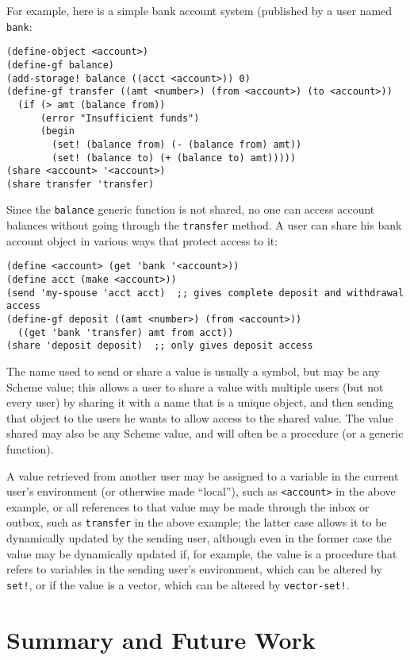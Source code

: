 \documentclass{article}
\begin{document}
For example, here is a simple bank account system (published by a user 
named \texttt{bank}:

\begin{verbatim}
(define-object <account>)
(define-gf balance)
(add-storage! balance ((acct <account>)) 0)
(define-gf transfer ((amt <number>) (from <account>) (to <account>))
  (if (> amt (balance from))
      (error "Insufficient funds")
      (begin
        (set! (balance from) (- (balance from) amt))
        (set! (balance to) (+ (balance to) amt)))))
(share <account> '<account>)
(share transfer 'transfer)
\end{verbatim}

Since the \texttt{balance} generic function is not shared, no one can
access account balances without going through the \texttt{transfer}
method.  A user can share his bank account object in various ways that 
protect access to it:

\begin{verbatim}
(define <account> (get 'bank '<account>))
(define acct (make <account>))
(send 'my-spouse 'acct acct)  ;; gives complete deposit and withdrawal access
(define-gf deposit ((amt <number>) (from <account>))
  ((get 'bank 'transfer) amt from acct))
(share 'deposit deposit)  ;; only gives deposit access
\end{verbatim}

The name used to send or share a value is usually a symbol, but may be 
any Scheme value; this allows a user to share a value with multiple users
(but not every user) by sharing it with a name that is a unique
object, and then sending that object to the users he wants to allow
access to the shared value.  The value shared may also be any Scheme
value, and will often be a procedure (or a generic function).

A value retrieved from another user may be assigned to a variable in
the current user's environment (or otherwise made ``local''), such as
\texttt{<account>} in the above example, or all references to that
value may be made through the inbox or outbox, such as
\texttt{transfer} in the above example; the latter case allows it to
be dynamically updated by the sending user, although even in the
former case the value may be dynamically updated if, for example, the
value is a procedure that refers to variables in the sending user's
environment, which can be altered by \texttt{set!}, or if the value is
a vector, which can be altered by \texttt{vector-set!}.

\section{Summary and Future Work}
\end{document}
